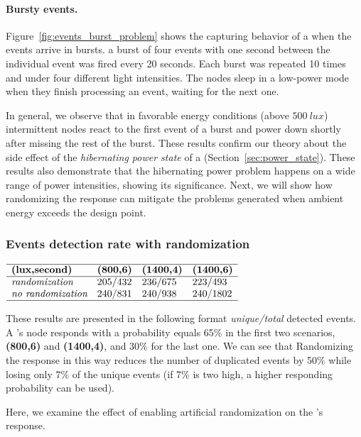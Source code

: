 \paragraph{Bursty events.}
Figure~\ref{fig:events_burst_problem} shows the capturing behavior of a \sys when the events arrive in bursts. a burst of four events with one second between the individual event was fired every 20 seconds. Each burst was repeated 10 times and under four different light intensities. The nodes sleep in a low-power mode when they finish processing an event, waiting for the next one. 

In general, we observe that in favorable energy conditions (above $\SI{500}{lux}$) intermittent nodes react to the first event of a burst and power down shortly after missing the rest of the burst. These results confirm our theory about the side effect of the \textit{hibernating power state} of a \sys (Section~\ref{sec:power_state}). These results also demonstrate that the hibernating power problem happens on a wide range of power intensities, showing its significance. Next, we will show how randomizing the response can mitigate the problems generated when ambient energy exceeds the design point. 

\subsubsection{Events detection rate with randomization}
\begin{table}
	\centering
    $
    \begin{array}{llll}\hline
     \textbf{(lux,second)} & \textbf{(800,6)} & \textbf{(1400,4)} & \textbf{(1400,6)}\\\hline
    \textit{randomization}    & 205/432 &  236/675 & 223/493 \\
    \textit{no randomization} & 240/831 &  240/938 & 240/1802 \\\hline
    \end{array}
    $
    \caption{These results are presented in the following format \textit{unique/total} detected events. A \sys's node responds with a probability equals 65\% in the first two scenarios,\textbf{(800,6)} and \textbf{(1400,4)}, and 30\% for the last one.   
    We can see that Randomizing the response in this way reduces the number of duplicated events by 50\% while losing only 7\% of the unique events (if 7\% is two high, a higher responding probability can be used).}
    \label{tab:regular_rand}
\end{table}
% 
Here, we examine the effect of enabling artificial randomization on the \sys's response. 

